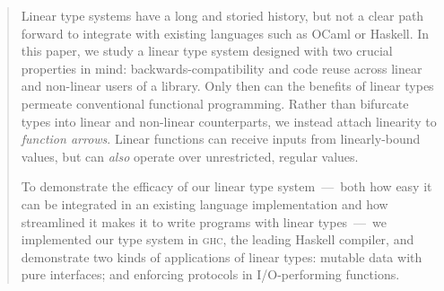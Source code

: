 \documentclass[acmsmall,screen]{acmart}\settopmatter{}
\begin{document}
\begin{abstract}
  Linear type systems have a long and storied history, but not a clear
  path forward to integrate with existing languages such as OCaml or
  Haskell. In this paper, we study a linear type system
  designed with two crucial properties in mind:
  backwards-compatibility and code reuse across linear and non-linear
  users of a library. Only then can the benefits of linear types
  permeate conventional functional programming.  Rather than bifurcate
  types into linear and non-linear counterparts, we instead
  attach linearity to {\em function arrows}.  Linear functions can
  receive inputs from linearly-bound values, but can {\em also} operate over
  unrestricted, regular values.

  To demonstrate the efficacy of our linear type system~---~both how
  easy it can be integrated in an existing language implementation and
  how streamlined it makes it to write programs with linear
  types~---~we implemented our type system in 
  \textsc{ghc}, the leading Haskell compiler, and demonstrate
  two kinds of applications of linear types:
  mutable data with pure interfaces;
  and enforcing protocols in I/O-performing functions.
\end{abstract}
\end{document}
